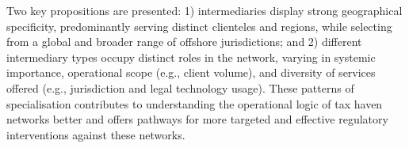 \documentclass[12pt, a4paper]{report}
\begin{document}
Two key propositions are presented: 1) intermediaries display strong geographical specificity, predominantly serving distinct clienteles and regions, while selecting from a global and broader range of offshore jurisdictions; and 2) different intermediary types occupy distinct roles in the network, varying in systemic importance, operational scope (e.g., client volume), and diversity of services offered (e.g., jurisdiction and legal technology usage). These patterns of specialisation contributes to understanding the operational logic of tax haven networks better and offers pathways for more targeted and effective regulatory interventions against these networks.

\pagestyle{fancy}
\addtocounter{page}{-1}








\appendix



\end{document}
